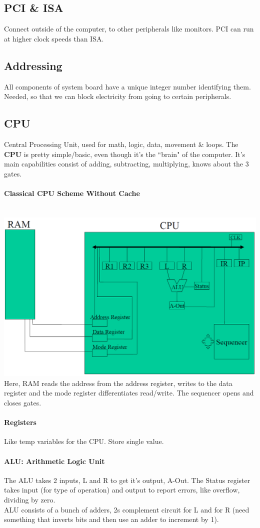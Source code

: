 \documentclass[12 pt]{article}
\begin{document}
	\subsection{PCI \& ISA}
	Connect outside of the computer, to other peripherals like monitors. PCI can run at higher clock speeds than ISA.
	\subsection{Addressing}
	All components of system board have a unique integer number identifying them. Needed, so that we can block electricity from going to certain peripherals.
	\subsection{CPU}
	Central Processing Unit, used for math, logic, data, movement \& loops.
	The \textbf{CPU} is pretty simple/basic, even though it's the ``brain" of the computer. It's main capabilities consist of adding, subtracting, multiplying, knows about the 3 gates.
	\paragraph{Classical CPU Scheme Without Cache} ~
	\\\includegraphics[scale=0.5]{cpu.png}
	Here, RAM reads the address from the address register, writes to the data register and the mode register differentiates read/write. The sequencer opens and closes gates.
	\paragraph{Registers}
	Like temp variables for the CPU. Store single value.
	\paragraph{ALU: Arithmetic Logic Unit}
	The ALU takes 2 inputs, L and R to get it's output, A-Out. The Status register takes input (for type of operation) and output to report errors, like overflow, dividing by zero.
	\\ ALU consists of a bunch of adders, 2s complement circuit for L and for R (need something that inverts bits and then use an adder to increment by 1).
\end{document}
